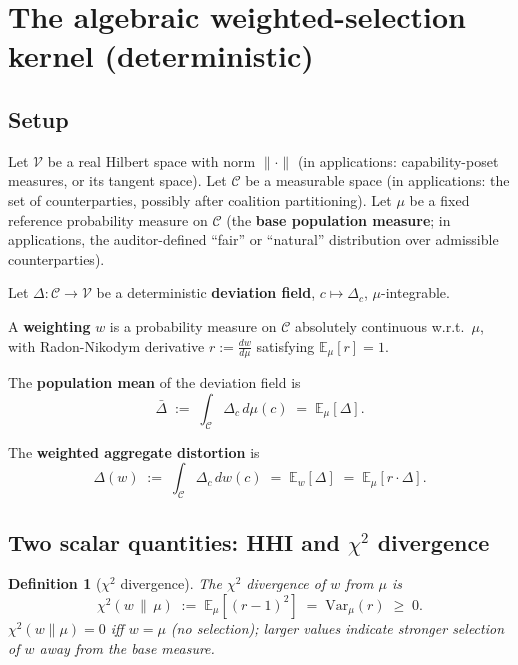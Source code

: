 \documentclass{article}
\newtheorem{definition}{Definition}
\newcommand{\chisq}{\chi^2}
\begin{document}
\section{The algebraic weighted-selection kernel (deterministic)}

\subsection{Setup}

Let $\mathcal{V}$ be a real Hilbert space with norm $\|\cdot\|$
(in applications: capability-poset measures, or its tangent
space).  Let $\mathcal{C}$ be a measurable space (in applications:
the set of counterparties, possibly after coalition partitioning).
Let $\mu$ be a fixed reference probability measure on
$\mathcal{C}$ (the \textbf{base population measure}; in
applications, the auditor-defined ``fair'' or ``natural''
distribution over admissible counterparties).

Let $\Delta: \mathcal{C} \to \mathcal{V}$ be a deterministic
\textbf{deviation field}, $c \mapsto \Delta_c$, $\mu$-integrable.

A \textbf{weighting} $w$ is a probability measure on $\mathcal{C}$
absolutely continuous w.r.t.\ $\mu$, with Radon-Nikodym derivative
$r := \frac{dw}{d\mu}$ satisfying $\mathbb{E}_\mu[r] = 1$.

The \textbf{population mean} of the deviation field is
\begin{equation}
\label{eq:popmean}
  \bar\Delta \;:=\; \int_\mathcal{C} \Delta_c \,d\mu(c) \;=\;
  \mathbb{E}_\mu[\Delta].
\end{equation}

The \textbf{weighted aggregate distortion} is
\begin{equation}
\label{eq:aggregate-distortion-v2}
  \Delta(w) \;:=\; \int_\mathcal{C} \Delta_c \,dw(c)
  \;=\; \mathbb{E}_w[\Delta] \;=\; \mathbb{E}_\mu[r \cdot \Delta].
\end{equation}

\subsection{Two scalar quantities: HHI and $\chi^2$ divergence}

\begin{definition}[$\chi^2$ divergence]
\label{def:chisq}
The \emph{$\chi^2$ divergence} of $w$ from $\mu$ is
\begin{equation}
\label{eq:chisq}
  \chisq(w \,\|\, \mu) \;:=\; \mathbb{E}_\mu[(r - 1)^2]
  \;=\; \mathrm{Var}_\mu(r) \;\geq\; 0.
\end{equation}
$\chisq(w \|\mu) = 0$ iff $w = \mu$ (no selection); larger values
indicate stronger selection of $w$ away from the base measure.
\end{definition}
\end{document}
